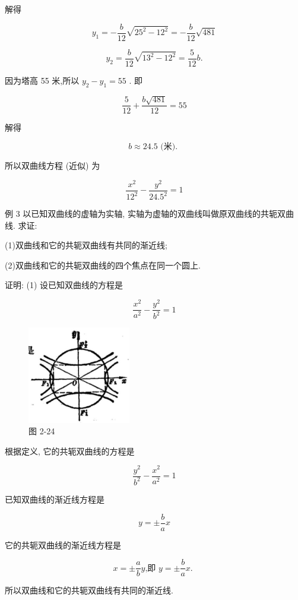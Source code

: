 \documentclass[lang=cn,newtx,12pt,scheme=chinese]{elegantbook}
\begin{document}
解得

\[
    {y}_{1} = - \frac{b}{12}\sqrt{{25}^{2} - {12}^{2}} = - \frac{b}{12}\sqrt{481}
\]

\[
    {y}_{2} = \frac{b}{12}\sqrt{{13}^{2} - {12}^{2}} = \frac{5}{12}b.
\]

因为塔高 55 米,所以 \({y}_{2} - {y}_{1} = {55}\) . 即

\[
  \frac{5}{12} + \frac{b\sqrt{481}}{12} = {55}
\]

解得

\[
  b \approx {24.5}\text{ (米). }
\]

所以双曲线方程 (近似) 为

\[
  \frac{{x}^{2}}{{12}^{2}} - \frac{{y}^{2}}{{24.5}^{2}} = 1
\]

例 3 以已知双曲线的虚轴为实轴, 实轴为虚轴的双曲线叫做原双曲线的共轭双曲线. 求证:

(1)双曲线和它的共轭双曲线有共同的渐近线;

(2)双曲线和它的共轭双曲线的四个焦点在同一个圆上.

证明: (1) 设已知双曲线的方程是

\[
  \frac{{x}^{2}}{{a}^{2}} - \frac{{y}^{2}}{{b}^{2}} = 1
\]

\begin{figure}[h]
  \centering
  \includegraphics[max width=0.4\textwidth]{images/01912cc2-ffb6-728e-9ae7-b113ff05c64b_104_706159.jpg}
  \caption{图 2-24}
\end{figure}

根据定义, 它的共轭双曲线的方程是

\[
  \frac{{y}^{2}}{{b}^{2}} - \frac{{x}^{2}}{{a}^{2}} = 1
\]

已知双曲线的渐近线方程是

\[
  y = \pm \frac{b}{a}x
\]

它的共轭双曲线的渐近线方程是

\[
  x = \pm \frac{a}{b}y\text{,即 }y = \pm \frac{b}{a}x\text{. }
\]

所以双曲线和它的共轭双曲线有共同的渐近线.
\end{document}
